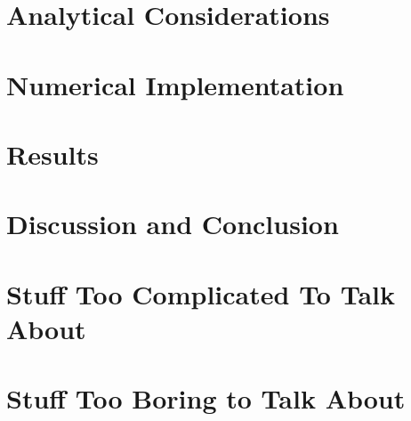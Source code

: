 \documentclass[12pt]{report}   %
\begin{document}
\chapter{Analytical Considerations}

\clearpage{\pagestyle{empty}\cleardoublepage}

\chapter{Numerical Implementation}

\clearpage{\pagestyle{empty}\cleardoublepage}

\chapter{Results}

\clearpage{\pagestyle{empty}\cleardoublepage}

\chapter{Discussion and Conclusion}

\clearpage{\pagestyle{empty}\cleardoublepage}

\appendix
\chapter{Stuff Too Complicated To Talk About}

\clearpage{\pagestyle{empty}\cleardoublepage}

\chapter{Stuff Too Boring to Talk About}

\clearpage{\pagestyle{empty}\cleardoublepage}



\begin{spacing}{0.9}
  
\end{spacing}
\end{document}
